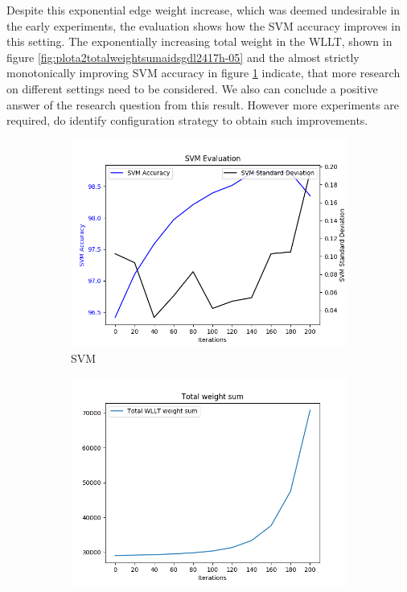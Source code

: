 		Despite this exponential edge weight increase, which was deemed undesirable in the early experiments, the evaluation shows how the SVM accuracy improves in this setting.
		The exponentially increasing total weight in the WLLT, shown in figure \ref{fig:plota2totalweightsumaidsgdl2417h-05} and the almost strictly monotonically improving SVM accuracy in figure \ref{fig:plota2svmaidsgdl2417h-05} indicate, that more research on different settings need to be considered.
		We also can conclude a positive answer of the research question from this result.
		However more experiments are required, do identify configuration strategy to obtain such improvements.
		
		\begin{figure}[H]
			\centering	
			\begin{subfigure}{0.45\textwidth}
				\centering
				\includegraphics[width=1.1\linewidth]{images/plotA2_SVM_AIDS_GDL_24_17h-05}
				\caption{SVM}
				\label{fig:plota2svmaidsgdl2417h-05}
			\end{subfigure}
			\begin{subfigure}{0.45\textwidth}
				\centering
				\includegraphics[width=1.1\linewidth]{images/plotA2_TotalWeightSum_AIDS_GDL_24_17h-05}

\end{subfigure}
\end{figure}
